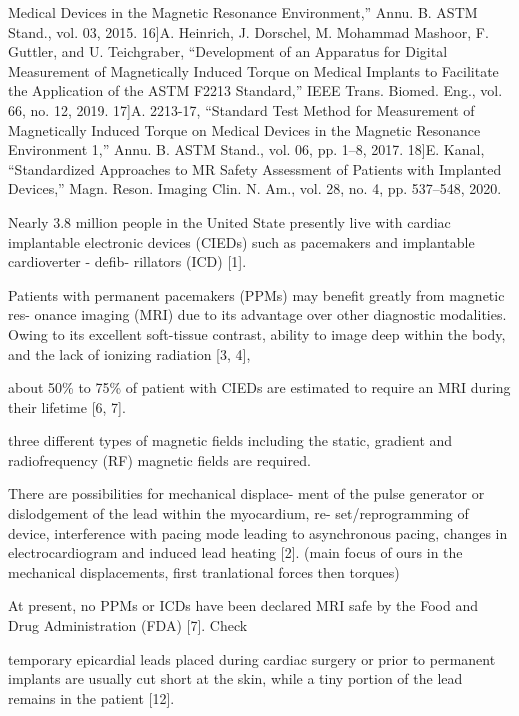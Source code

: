 Medical Devices in the Magnetic Resonance Environment,” Annu. B. ASTM Stand., vol. 03, 2015.
16]A. Heinrich, J. Dorschel, M. Mohammad Mashoor, F. Guttler, and U. Teichgraber, “Development of an Apparatus
for Digital Measurement of Magnetically Induced Torque on Medical Implants to Facilitate the Application of the
ASTM F2213 Standard,” IEEE Trans. Biomed. Eng., vol. 66, no. 12, 2019.
17]A. 2213-17, “Standard Test Method for Measurement of Magnetically Induced Torque on Medical Devices in the
Magnetic Resonance Environment 1,” Annu. B. ASTM Stand., vol. 06, pp. 1–8, 2017.
18]E. Kanal, “Standardized Approaches to MR Safety Assessment of Patients with Implanted Devices,” Magn. Reson.
Imaging Clin. N. Am., vol. 28, no. 4, pp. 537–548, 2020.

Nearly 3.8 million people in the United State presently live with cardiac implantable
electronic devices (CIEDs) such as pacemakers and implantable cardioverter - defib-
rillators (ICD) [1].

Patients with permanent pacemakers (PPMs) may benefit greatly from magnetic res-
onance imaging (MRI) due to its advantage over other diagnostic modalities. Owing
to its excellent soft-tissue contrast, ability to image deep within the body, and the
lack of ionizing radiation [3, 4],

about 50\% to 75\% of patient
with CIEDs are estimated to require an MRI during their lifetime [6, 7].

three diﬀerent types of magnetic fields including
the static, gradient and radiofrequency (RF) magnetic fields are required.

There are possibilities for mechanical displace-
ment of the pulse generator or dislodgement of the lead within the myocardium, re-
set/reprogramming of device, interference with pacing mode leading to asynchronous
pacing, changes in electrocardiogram and induced lead heating [2]. (main focus of ours in the mechanical displacements, first tranlational forces then torques)

At present,
no PPMs or ICDs have been declared MRI safe by the Food and Drug Administration
(FDA) [7]. Check


temporary epicardial leads placed during cardiac surgery or prior to
permanent implants are usually cut short at the skin, while a tiny portion of the
lead remains in the patient [12].

